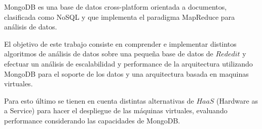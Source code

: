 MongoDB es una base de datos cross-platform orientada a documentos, clasificada como NoSQL y que implementa el paradigma MapReduce para análisis de datos.


El objetivo de este trabajo consiste en comprender e implementar distintos algoritmos de análisis de datos sobre una peque\~na base de datos de $Rededit$ y efectuar un análisis de escalabilidad y performance de la arquitectura utilizando MongoDB para el soporte de los datos y una arquitectura basada en maquinas virtuales.


Para esto último se tienen en cuenta distintas alternativas de $HaaS$ (Hardware as a Service) para hacer el despliegue de las máquinas virtuales, evaluando performance considerando las capacidades de MongoDB.


